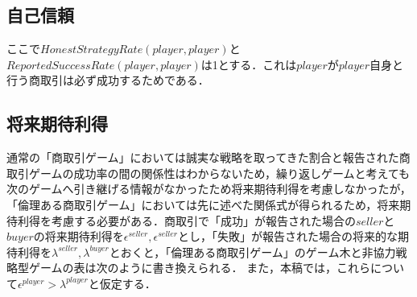 \subsection{自己信頼}
ここで$ HonestStrategyRate(player, player) $と$ ReportedSuccessRate(player, player) $は1とする．これは$ player $が$ player $自身と行う商取引は必ず成功するためである．

\subsection{将来期待利得}
通常の「商取引ゲーム」においては誠実な戦略を取ってきた割合と報告された商取引ゲームの成功率の間の関係性はわからないため，繰り返しゲームと考えても次のゲームへ引き継げる情報がなかったため将来期待利得を考慮しなかったが，「倫理ある商取引ゲーム」においては先に述べた関係式が得られるため，将来期待利得を考慮する必要がある．商取引で「成功」が報告された場合の$ seller $と$ buyer $の将来期待利得を$ \epsilon^{seller}, \epsilon^{seller} $とし，「失敗」が報告された場合の将来的な期待利得を$ \lambda^{seller}, \lambda^{buyer} $とおくと，「倫理ある商取引ゲーム」のゲーム木と非協力戦略型ゲームの表は次のように書き換えられる．
また，本稿では，これらについて$ \epsilon^{player} > \lambda^{player} $と仮定する．
